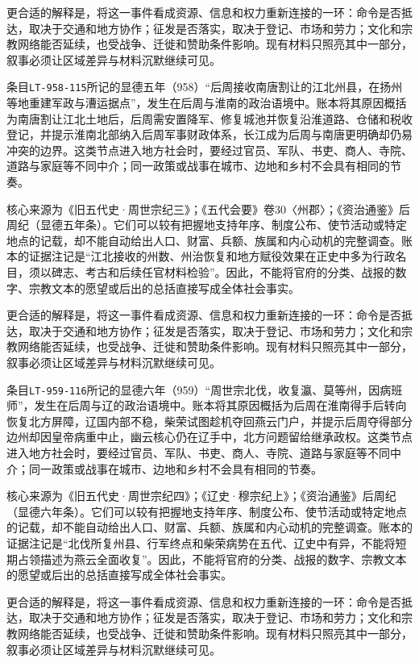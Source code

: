 更合适的解释是，将这一事件看成资源、信息和权力重新连接的一环：命令是否抵达，取决于交通和地方协作；征发是否落实，取决于登记、市场和劳力；文化和宗教网络能否延续，也受战争、迁徙和赞助条件影响。现有材料只照亮其中一部分，叙事必须让区域差异与材料沉默继续可见。

条目\texttt{LT-958-115}所记的显德五年（958）“后周接收南唐割让的江北州县，在扬州等地重建军政与漕运据点”，发生在后周与淮南的政治语境中。账本将其原因概括为南唐割让江北土地后，后周需安置降军、修复城池并恢复沿淮道路、仓储和税收登记，并提示淮南北部纳入后周军事财政体系，长江成为后周与南唐更明确却仍易冲突的边界。这类节点进入地方社会时，要经过官员、军队、书吏、商人、寺院、道路与家庭等不同中介；同一政策或战事在城市、边地和乡村不会具有相同的节奏。

核心来源为《旧五代史·周世宗纪三》；《五代会要》卷30〈州郡〉；《资治通鉴》后周纪（显德五年条）。它们可以较有把握地支持年序、制度公布、使节活动或特定地点的记载，却不能自动给出人口、财富、兵额、族属和内心动机的完整调查。账本的证据注记是“江北接收的州数、州治恢复和地方赋役效果在正史中多为行政名目，须以碑志、考古和后续任官材料检验”。因此，不能将官府的分类、战报的数字、宗教文本的愿望或后出的总括直接写成全体社会事实。

更合适的解释是，将这一事件看成资源、信息和权力重新连接的一环：命令是否抵达，取决于交通和地方协作；征发是否落实，取决于登记、市场和劳力；文化和宗教网络能否延续，也受战争、迁徙和赞助条件影响。现有材料只照亮其中一部分，叙事必须让区域差异与材料沉默继续可见。

条目\texttt{LT-959-116}所记的显德六年（959）“周世宗北伐，收复瀛、莫等州，因病班师”，发生在后周与辽的政治语境中。账本将其原因概括为后周在淮南得手后转向恢复北方屏障，辽国内部不稳，柴荣试图趁机夺回燕云门户，并提示后周夺得部分边州却因皇帝病重中止，幽云核心仍在辽手中，北方问题留给继承政权。这类节点进入地方社会时，要经过官员、军队、书吏、商人、寺院、道路与家庭等不同中介；同一政策或战事在城市、边地和乡村不会具有相同的节奏。

核心来源为《旧五代史·周世宗纪四》；《辽史·穆宗纪上》；《资治通鉴》后周纪（显德六年条）。它们可以较有把握地支持年序、制度公布、使节活动或特定地点的记载，却不能自动给出人口、财富、兵额、族属和内心动机的完整调查。账本的证据注记是“北伐所复州县、行军终点和柴荣病势在五代、辽史中有异，不能将短期占领描述为燕云全面收复”。因此，不能将官府的分类、战报的数字、宗教文本的愿望或后出的总括直接写成全体社会事实。

更合适的解释是，将这一事件看成资源、信息和权力重新连接的一环：命令是否抵达，取决于交通和地方协作；征发是否落实，取决于登记、市场和劳力；文化和宗教网络能否延续，也受战争、迁徙和赞助条件影响。现有材料只照亮其中一部分，叙事必须让区域差异与材料沉默继续可见。


